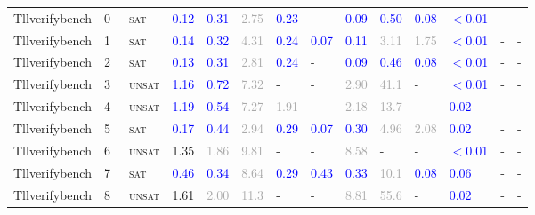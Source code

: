 \begin{center}
{\begin{longtable}{@{}llllllllllllll@{}}
\midrule
Tllverifybench & 0 & ~\textsc{sat} & \textcolor{blue}{0.12} & \textcolor{blue}{0.31} & \textcolor{darkgray}{2.75} & \textcolor{blue}{0.23} & - & \textcolor{blue}{0.09} & \textcolor{blue}{0.50} & \textcolor{blue}{0.08} & \textcolor{blue}{$<$0.01} & - & - \\
Tllverifybench & 1 & ~\textsc{sat} & \textcolor{blue}{0.14} & \textcolor{blue}{0.32} & \textcolor{darkgray}{4.31} & \textcolor{blue}{0.24} & \textcolor{blue}{0.07} & \textcolor{blue}{0.11} & \textcolor{darkgray}{3.11} & \textcolor{darkgray}{1.75} & \textcolor{blue}{$<$0.01} & - & - \\
Tllverifybench & 2 & ~\textsc{sat} & \textcolor{blue}{0.13} & \textcolor{blue}{0.31} & \textcolor{darkgray}{2.81} & \textcolor{blue}{0.24} & - & \textcolor{blue}{0.09} & \textcolor{blue}{0.46} & \textcolor{blue}{0.08} & \textcolor{blue}{$<$0.01} & - & - \\
Tllverifybench & 3 & ~\textsc{unsat} & \textcolor{blue}{1.16} & \textcolor{blue}{0.72} & \textcolor{darkgray}{7.32} & - & - & \textcolor{darkgray}{2.90} & \textcolor{darkgray}{41.1} & - & \textcolor{blue}{$<$0.01} & - & - \\
Tllverifybench & 4 & ~\textsc{unsat} & \textcolor{blue}{1.19} & \textcolor{blue}{0.54} & \textcolor{darkgray}{7.27} & \textcolor{darkgray}{1.91} & - & \textcolor{darkgray}{2.18} & \textcolor{darkgray}{13.7} & - & \textcolor{blue}{0.02} & - & - \\
Tllverifybench & 5 & ~\textsc{sat} & \textcolor{blue}{0.17} & \textcolor{blue}{0.44} & \textcolor{darkgray}{2.94} & \textcolor{blue}{0.29} & \textcolor{blue}{0.07} & \textcolor{blue}{0.30} & \textcolor{darkgray}{4.96} & \textcolor{darkgray}{2.08} & \textcolor{blue}{0.02} & - & - \\
Tllverifybench & 6 & ~\textsc{unsat} & \textcolor{second}{1.35} & \textcolor{darkgray}{1.86} & \textcolor{darkgray}{9.81} & - & - & \textcolor{darkgray}{8.58} & - & - & \textcolor{blue}{$<$0.01} & - & - \\
Tllverifybench & 7 & ~\textsc{sat} & \textcolor{blue}{0.46} & \textcolor{blue}{0.34} & \textcolor{darkgray}{8.64} & \textcolor{blue}{0.29} & \textcolor{blue}{0.43} & \textcolor{blue}{0.33} & \textcolor{darkgray}{10.1} & \textcolor{blue}{0.08} & \textcolor{blue}{0.06} & - & - \\
Tllverifybench & 8 & ~\textsc{unsat} & \textcolor{second}{1.61} & \textcolor{darkgray}{2.00} & \textcolor{darkgray}{11.3} & - & - & \textcolor{darkgray}{8.81} & \textcolor{darkgray}{55.6} & - & \textcolor{blue}{0.02} & - & - \\

\end{longtable}}
\end{center}
